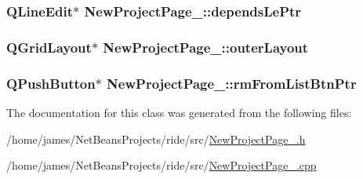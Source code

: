 \hypertarget{class_new_project_page__4_a2e6e4ec9aadc2398498d542243b5f9a9}{
\subsubsection[{depends\-Le\-Ptr}]{\setlength{\rightskip}{0pt plus 5cm}Q\-Line\-Edit$\ast$ New\-Project\-Page\-\_\-::depends\-Le\-Ptr\hspace{0.3cm}{\ttfamily [private]}}}\label{class_new_project_page__4_a2e6e4ec9aadc2398498d542243b5f9a9}
\hypertarget{class_new_project_page__4_a3e2ba713d9f039382de43a5b362ff3b8}{
\subsubsection[{outer\-Layout}]{\setlength{\rightskip}{0pt plus 5cm}Q\-Grid\-Layout$\ast$ New\-Project\-Page\-\_\-::outer\-Layout\hspace{0.3cm}{\ttfamily [private]}}}\label{class_new_project_page__4_a3e2ba713d9f039382de43a5b362ff3b8}
\hypertarget{class_new_project_page__4_adc7e800ceb08846ee3154e309f19542a}{
\subsubsection[{rm\-From\-List\-Btn\-Ptr}]{\setlength{\rightskip}{0pt plus 5cm}Q\-Push\-Button$\ast$ New\-Project\-Page\-\_\-::rm\-From\-List\-Btn\-Ptr\hspace{0.3cm}{\ttfamily [private]}}}\label{class_new_project_page__4_adc7e800ceb08846ee3154e309f19542a}


The documentation for this class was generated from the following files\-:\begin{DoxyCompactItemize}
\item 
/home/james/\-Net\-Beans\-Projects/ride/src/\hyperlink{_new_project_page__4_8h}{New\-Project\-Page\-\_.\-h}\item 
/home/james/\-Net\-Beans\-Projects/ride/src/\hyperlink{_new_project_page__4_8cpp}{New\-Project\-Page\-\_.\-cpp}\end{DoxyCompactItemize}
